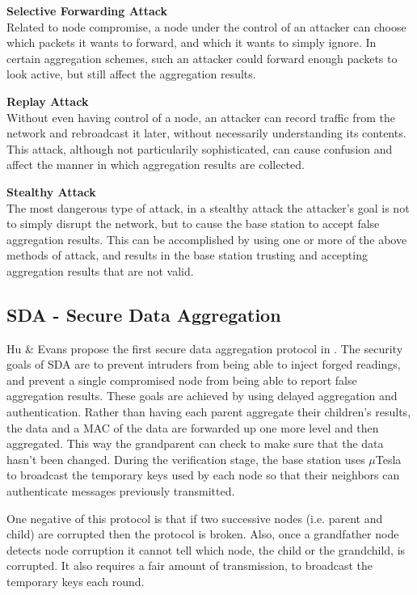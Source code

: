 \documentclass[a4paper]{article}
\begin{document}
{\bf Selective Forwarding Attack} \\
Related to node compromise, a node under the control of an attacker can choose
which packets it wants to forward, and which it wants to simply ignore. In
certain aggregation schemes, such an attacker could forward enough packets to
look active, but still affect the aggregation results.

{\bf Replay Attack} \\
Without even having control of a node, an attacker can record traffic from the
network and rebroadcast it later, without necessarily understanding its
contents. This attack, although not particularily sophisticated, can cause
confusion and affect the manner in which aggregation results are collected.

{\bf Stealthy Attack} \\
The most dangerous type of attack, in a stealthy attack the attacker's goal is
not to simply disrupt the network, but to cause the base station to accept
false aggregation results. This can be accomplished by using one or more of
the above methods of attack, and results in the base station trusting and
accepting aggregation results that are not valid.

\subsection{SDA - Secure Data Aggregation}

Hu \& Evans propose the first secure data aggregation protocol in
\cite{SDA}. The security goals of SDA are to prevent intruders from being able
to inject forged readings, and prevent a single compromised node from being
able to report false aggregation results. These goals are achieved by using
delayed aggregation and authentication. Rather than having each parent
aggregate their children's results, the data and a MAC of the data are
forwarded up one more level and then aggregated. This way the grandparent can
check to make sure that the data hasn't been changed. During the verification
stage, the base station uses $\mu$Tesla to broadcast the temporary keys used
by each node so that their neighbors can authenticate messages previously
transmitted.

One negative of this protocol is that if two successive nodes (i.e. parent and
child) are corrupted then the protocol is broken. Also, once a grandfather
node detects node corruption it cannot tell which node, the child or the
grandchild, is corrupted. It also requires a fair amount of transmission, to
broadcast the temporary keys each round.
\end{document}
